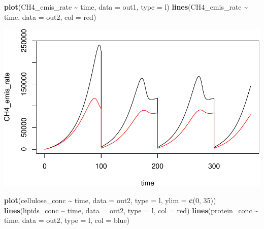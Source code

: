 \documentclass[
]{article}
\newenvironment{Shaded}{\begin{snugshade}}{\end{snugshade}}
\newcommand{\AttributeTok}[1]{\textcolor[rgb]{0.13,0.29,0.53}{#1}}
\newcommand{\DecValTok}[1]{\textcolor[rgb]{0.00,0.00,0.81}{#1}}
\newcommand{\FunctionTok}[1]{\textcolor[rgb]{0.13,0.29,0.53}{\textbf{#1}}}
\newcommand{\NormalTok}[1]{#1}
\newcommand{\SpecialCharTok}[1]{\textcolor[rgb]{0.81,0.36,0.00}{\textbf{#1}}}
\newcommand{\StringTok}[1]{\textcolor[rgb]{0.31,0.60,0.02}{#1}}
\begin{document}
\begin{Shaded}
\begin{Highlighting}[]
\FunctionTok{plot}\NormalTok{(CH4\_emis\_rate }\SpecialCharTok{\textasciitilde{}}\NormalTok{ time, }\AttributeTok{data =}\NormalTok{ out1, }\AttributeTok{type =} \StringTok{\textquotesingle{}l\textquotesingle{}}\NormalTok{)}
\FunctionTok{lines}\NormalTok{(CH4\_emis\_rate }\SpecialCharTok{\textasciitilde{}}\NormalTok{ time, }\AttributeTok{data =}\NormalTok{ out2, }\AttributeTok{col =} \StringTok{\textquotesingle{}red\textquotesingle{}}\NormalTok{)}
\end{Highlighting}
\end{Shaded}

\includegraphics{simple_demo_files/figure-latex/unnamed-chunk-13-2.pdf}

\begin{Shaded}
\begin{Highlighting}[]
\FunctionTok{plot}\NormalTok{(cellulose\_conc }\SpecialCharTok{\textasciitilde{}}\NormalTok{ time, }\AttributeTok{data =}\NormalTok{ out2, }\AttributeTok{type =} \StringTok{\textquotesingle{}l\textquotesingle{}}\NormalTok{, }\AttributeTok{ylim =} \FunctionTok{c}\NormalTok{(}\DecValTok{0}\NormalTok{, }\DecValTok{35}\NormalTok{))}
\FunctionTok{lines}\NormalTok{(lipids\_conc }\SpecialCharTok{\textasciitilde{}}\NormalTok{ time, }\AttributeTok{data =}\NormalTok{ out2, }\AttributeTok{type =} \StringTok{\textquotesingle{}l\textquotesingle{}}\NormalTok{, }\AttributeTok{col =} \StringTok{\textquotesingle{}red\textquotesingle{}}\NormalTok{)}
\FunctionTok{lines}\NormalTok{(protein\_conc }\SpecialCharTok{\textasciitilde{}}\NormalTok{ time, }\AttributeTok{data =}\NormalTok{ out2, }\AttributeTok{type =} \StringTok{\textquotesingle{}l\textquotesingle{}}\NormalTok{, }\AttributeTok{col =} \StringTok{\textquotesingle{}blue\textquotesingle{}}\NormalTok{)}
\end{Highlighting}
\end{Shaded}
\end{document}
